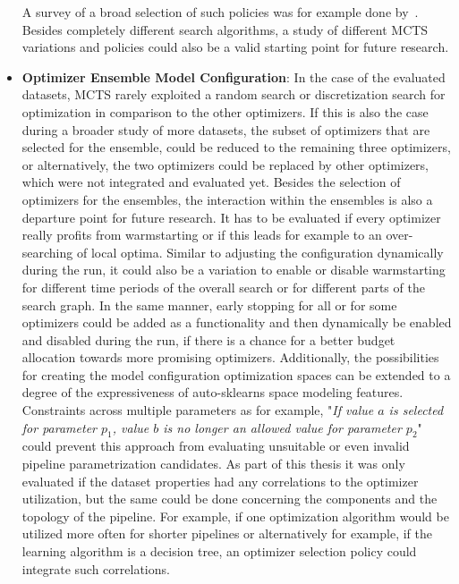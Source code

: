 \begin{itemize}
    A survey of a broad selection of such policies was for example done by~\textcite{Browne-Policies}.
    Besides completely different search algorithms, a study of different MCTS variations and policies could also be a valid starting point for future research.
    \item \textbf{Optimizer Ensemble Model Configuration}: In the case of the evaluated datasets, MCTS rarely exploited a random search or discretization search for optimization in comparison to the other optimizers.
    If this is also the case during a broader study of more datasets, the subset of optimizers that are selected for the ensemble, could be reduced to the remaining three optimizers, or alternatively, the two optimizers could be replaced by other optimizers, which were not integrated and evaluated yet.\newline
    Besides the selection of optimizers for the ensembles, the interaction within the ensembles is also a departure point for future research.
    It has to be evaluated if every optimizer really profits from warmstarting or if this leads for example to an over-searching of local optima.\newline
    Similar to adjusting the configuration dynamically during the run, it could also be a variation to enable or disable warmstarting for different time periods of the overall search or for different parts of the search graph.
    In the same manner, early stopping for all or for some optimizers could be added as a functionality and then dynamically be enabled and disabled during the run, if there is a chance for a better budget allocation towards more promising optimizers.\newline
    Additionally, the possibilities for creating the model configuration optimization spaces can be extended to a degree of the expressiveness of auto-sklearns space modeling features.
    Constraints across multiple parameters as for example, "\textit{If value $a$ is selected for parameter $p_1$, value $b$ is no longer an allowed value for parameter $p_2$}" could prevent this approach from evaluating unsuitable or even invalid pipeline parametrization candidates.\newline
    As part of this thesis it was only evaluated if the dataset properties had any correlations to the optimizer utilization, but the same could be done concerning the components and the topology of the pipeline.
    For example, if one optimization algorithm would be utilized more often for shorter pipelines or alternatively for example, if the learning algorithm is a decision tree, an optimizer selection policy could integrate such correlations.

\end{itemize}
